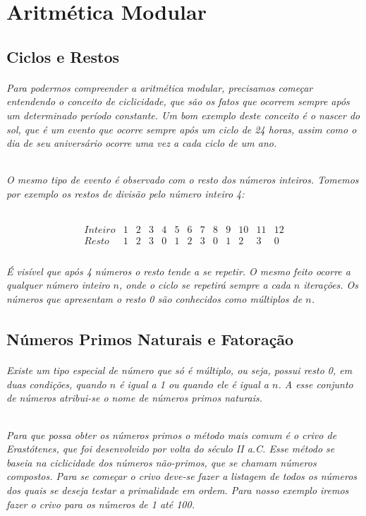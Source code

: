 \chapter {Aritm\'{e}tica Modular}
\label{Mod}

\section{Ciclos e Restos}	
\subparagraph{
Para podermos compreender a aritm\'etica modular, precisamos come\c{c}ar entendendo o conceito de ciclicidade, que s\~ao os fatos que ocorrem sempre ap\'os um determinado per\'iodo constante. Um bom exemplo deste conceito \'e o nascer do sol, que \'e um evento que ocorre sempre ap\'os um ciclo de {24} horas, assim como o dia de seu anivers\'ario ocorre uma vez a cada ciclo de um ano.
}
\subparagraph{
O mesmo tipo de evento \'e observado com o resto dos n\'umeros inteiros. Tomemos por exemplo os restos de divis\~ao pelo n\'umero inteiro {4}:
}

\[
\begin{array}{ccccccccccccc}
  {Inteiro} & 1 & 2 & 3 & 4 & 5 & 6 & 7 & 8 & 9 & 10 &  11 & 12 \\  
	{Resto} & 1 & 2 & 3 & 0 & 1 & 2 & 3 & 0 & 1 & 2  &  3 & 0 \\ 
\end{array}
\]

\subparagraph{
\'E vis\'ivel que ap\'os {4} n\'umeros o resto tende a se repetir. O mesmo feito ocorre a qualquer n\'umero inteiro $n$, onde o ciclo se repetir\'a sempre a cada $n$ itera\c{c}\~oes. Os n\'umeros que apresentam o resto {0} s\~ao conhecidos como m\'ultiplos de $n$.
}

\section{N\'{u}meros Primos Naturais e Fatora\c{c}\~{a}o}

\subparagraph{
Existe um tipo especial de n\'umero que s\'o \'e m\'ultiplo, ou seja, possui resto {0}, em duas condi\c{c}\~oes, quando $n$ \'e igual a {1} ou quando ele \'e igual a $n$. A esse conjunto de n\'umeros atribui-se o nome de \textit{n\'umeros primos naturais}.
}
\subparagraph{
Para que possa obter os n\'umeros primos o m\'etodo mais comum \'e o crivo de Erast\'otenes, que foi desenvolvido por volta do s\'eculo II a.C. Esse m\'etodo se baseia na ciclicidade dos n\'umeros n\~ao-primos, que se chamam \textit{n\'umeros compostos}. Para se come\c{c}ar o crivo deve-se fazer a listagem de todos os n\'umeros dos quais se deseja testar a primalidade em ordem. Para nosso exemplo iremos fazer o crivo para os n\'umeros de {1} at\'e {100}.
}

